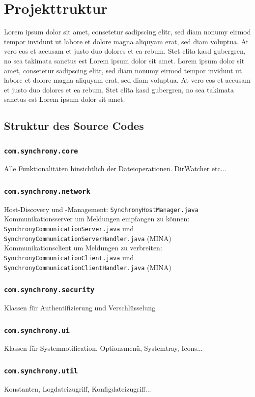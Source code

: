 \documentclass[12pt,oneside,a4paper,bibtotoc,liststotoc,pointlessnumbers]{scrartcl}
\begin{document}
\newpage
\section{Projekttruktur}
Lorem ipsum dolor sit amet, consetetur sadipscing elitr, sed diam nonumy eirmod tempor invidunt ut labore et dolore magna aliquyam erat, sed diam voluptua. At vero eos et accusam et justo duo dolores et ea rebum. Stet clita kasd gubergren, no sea takimata sanctus est Lorem ipsum dolor sit amet. Lorem ipsum dolor sit amet, consetetur sadipscing elitr, sed diam nonumy eirmod tempor invidunt ut labore et dolore magna aliquyam erat, sed diam voluptua. At vero eos et accusam et justo duo dolores et ea rebum. Stet clita kasd gubergren, no sea takimata sanctus est Lorem ipsum dolor sit amet.
\subsection{Struktur des Source Codes}
\subsubsection{\texttt{com.synchrony.core}}
Alle Funktionalitäten hinsichtlich der Dateioperationen. DirWatcher etc...
\subsubsection{\texttt{com.synchrony.network}}
Host-Discovery und -Management: \texttt{SynchronyHostManager.java}\\
Kommunikationsserver um Meldungen empfangen zu können: \texttt{SynchronyCommunicationServer.java} und \texttt{SynchronyCommunicationServerHandler.java} (MINA)\\
Kommunikationsclient um Meldungen zu verbreiten: \texttt{SynchronyCommunicationClient.java} und \texttt{SynchronyCommunicationClientHandler.java} (MINA)\\
\subsubsection{\texttt{com.synchrony.security}}
Klassen für Authentifizierung und Verschlüsselung
\subsubsection{\texttt{com.synchrony.ui}}
Klassen für Systemnotification, Optionsmenü, Systemtray, Icons...
\subsubsection{\texttt{com.synchrony.util}}
Konstanten, Logdateizugriff, Konfigdateizugriff...
\end{document}
